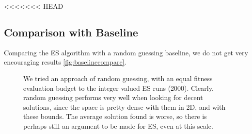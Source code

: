 <<<<<<< HEAD
\subsection{Comparison with Baseline}
Comparing the ES algorithm with a random guessing baseline, we do not get very encouraging results \cref{fig:baselinecompare}.

\begin{figure}[ht]
    \hfill
    \caption{We tried an approach of random guessing, with an equal fitness evaluation budget to the integer valued ES runs (2000). Clearly, random guessing performs very well when looking for decent solutions, since the space is pretty dense with them in 2D, and with these bounds. The average solution found is worse, so there is perhaps still an argument to be made for ES, even at this scale.}
    \label{fig:randomguessingufig} 
\end{figure} 

